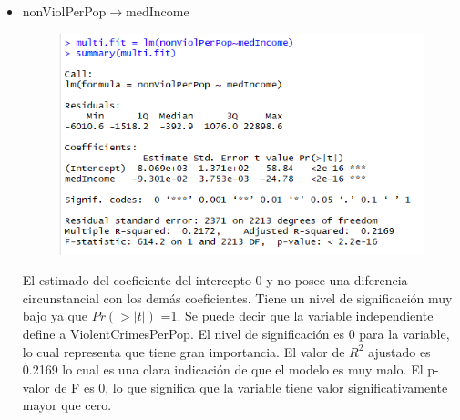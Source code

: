 \documentclass[a4paper,10pt,twocolumn]{article}
\begin{document}
\begin{itemize}
	\item {nonViolPerPop$\rightarrow$medIncome}




		\begin{figure}[H]
			\begin{center}
				\includegraphics[width=.92\columnwidth,right]{figures/multifit7.png}
			\end{center}
		\end{figure}

	El estimado del coeficiente del intercepto 0 y no posee una diferencia circunstancial con los demás coeficientes. Tiene un nivel de significación muy bajo ya que $Pr(> | t | )$ =1.
	Se puede decir que la variable independiente define a ViolentCrimesPerPop. El nivel de significación es 0 para la variable, lo cual representa que tiene gran importancia. El valor de $R^2$ ajustado es 0.2169 lo cual es una clara indicación de que el modelo es muy malo. El p-valor de F es 0, lo que significa que la variable tiene valor significativamente mayor que cero.


\end{itemize}
\end{document}
